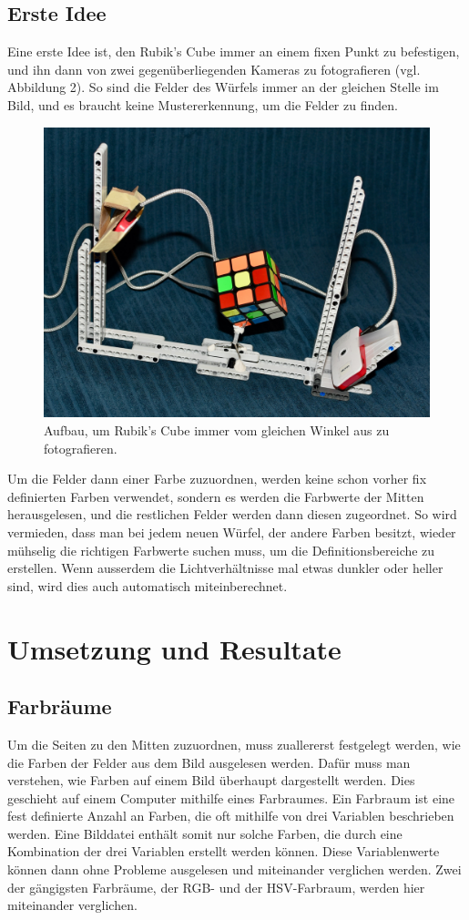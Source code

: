 \documentclass[a4paper, 12pt]{article}
\begin{document}
\subsection{Erste Idee}
Eine erste Idee ist, den Rubik's Cube immer an einem fixen Punkt zu befestigen, und ihn dann von zwei gegenüberliegenden Kameras zu fotografieren (vgl. Abbildung 2). So sind die Felder des Würfels immer an der gleichen Stelle im Bild, und es braucht keine Mustererkennung, um die Felder zu finden.
\begin{figure}[h]
\includegraphics[scale=0.25]{Aufbau_Bild}
\caption{Aufbau, um Rubik's Cube immer vom gleichen Winkel aus zu fotografieren.}
\end{figure}
\newline
Um die Felder dann einer Farbe zuzuordnen, werden keine schon vorher fix definierten Farben verwendet, sondern es werden die Farbwerte der Mitten herausgelesen, und die restlichen Felder werden dann diesen zugeordnet. So wird vermieden, dass man bei jedem neuen Würfel, der andere Farben besitzt, wieder mühselig die richtigen Farbwerte suchen muss, um die Definitionsbereiche zu erstellen. Wenn ausserdem die Lichtverhältnisse  mal etwas dunkler oder heller sind, wird dies auch automatisch miteinberechnet. 
\newpage
\section{Umsetzung und Resultate}
\subsection{Farbräume}
Um die Seiten zu den Mitten zuzuordnen, muss zuallererst festgelegt werden, wie die Farben der Felder aus dem Bild ausgelesen werden. Dafür muss man verstehen, wie Farben auf einem Bild überhaupt dargestellt werden. Dies geschieht auf einem Computer mithilfe eines Farbraumes. Ein Farbraum ist eine fest definierte Anzahl an Farben, die oft mithilfe von drei Variablen beschrieben werden. Eine Bilddatei enthält somit nur solche Farben, die durch eine Kombination der drei Variablen erstellt werden können. \cite{Farbraum} Diese Variablenwerte können dann ohne Probleme ausgelesen und miteinander verglichen werden. Zwei der gängigsten Farbräume, der RGB- und der HSV-Farbraum, werden hier miteinander verglichen. 
\end{document}
